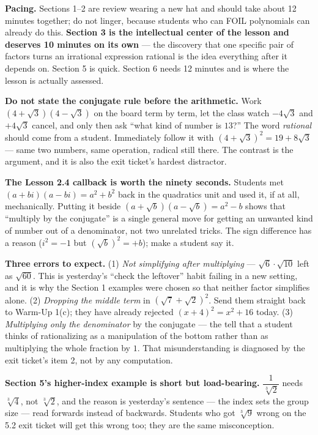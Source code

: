 \documentclass[10pt]{article}
\begin{document}
\begin{teachernote}
\textbf{Pacing.} Sections 1--2 are review wearing a new hat and should take about 12 minutes
together; do not linger, because students who can FOIL polynomials can already do this.
\textbf{Section 3 is the intellectual center of the lesson and deserves 10 minutes on its own} ---
the discovery that one specific pair of factors turns an irrational expression rational is the idea
everything after it depends on. Section 5 is quick. Section 6 needs 12 minutes and is where the
lesson is actually assessed.

\textbf{Do not state the conjugate rule before the arithmetic.} Work
$\left(4+\sqrt3\right)\left(4-\sqrt3\right)$ on the board term by term, let the class watch
$-4\sqrt3$ and $+4\sqrt3$ cancel, and only then ask ``what kind of number is $13$?'' The word
\emph{rational} should come from a student. Immediately follow it with
$\left(4+\sqrt3\right)^{2}=19+8\sqrt3$ --- same two numbers, same operation, radical still there.
The contrast is the argument, and it is also the exit ticket's hardest distractor.

\textbf{The Lesson 2.4 callback is worth the ninety seconds.} Students met $(a+bi)(a-bi)=a^{2}+b^{2}$
back in the quadratics unit and used it, if at all, mechanically. Putting it beside
$\left(a+\sqrt b\right)\left(a-\sqrt b\right)=a^{2}-b$ shows that ``multiply by the conjugate'' is a
single general move for getting an unwanted kind of number out of a denominator, not two unrelated
tricks. The sign difference has a reason ($i^{2}=-1$ but $(\sqrt b)^{2}=+b$); make a student say it.

\textbf{Three errors to expect.} (1) \emph{Not simplifying after multiplying} --- $\sqrt6\cdot
\sqrt{10}$ left as $\sqrt{60}$. This is yesterday's ``check the leftover'' habit failing in a new
setting, and it is why the Section 1 examples were chosen so that neither factor simplifies alone.
(2) \emph{Dropping the middle term} in $\left(\sqrt7+\sqrt2\right)^{2}$. Send them straight back to
Warm-Up 1(c); they have already rejected $(x+4)^{2}=x^{2}+16$ today. (3) \emph{Multiplying only the
denominator} by the conjugate --- the tell that a student thinks of rationalizing as a manipulation
of the bottom rather than as multiplying the whole fraction by $1$. That misunderstanding is
diagnosed by the exit ticket's item 2, not by any computation.

\textbf{Section 5's higher-index example is short but load-bearing.} $\dfrac{1}{\sqrt[3]2}$ needs
$\sqrt[3]4$, not $\sqrt[3]2$, and the reason is yesterday's sentence --- the index sets the group
size --- read forwards instead of backwards. Students who got $\sqrt[3]{9}$ wrong on the 5.2 exit
ticket will get this wrong too; they are the same misconception.
\end{teachernote}
\end{document}
